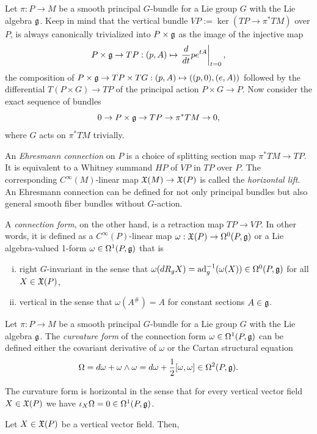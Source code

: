 \documentclass{../../large}
\begin{document}
\begin{prb}
Let $\pi:P\to M$ be a smooth principal $G$-bundle for a Lie group $G$ with the Lie algebra $\mathfrak{g}$.
Keep in mind that the vertical bundle $VP:=\ker(TP\to\pi^*TM)$ over $P$, is always canonically trivialized into $P\times\mathfrak{g}$ as the image of the injective map
\[P\times\mathfrak{g}\to TP:(p,A)\mapsto\left.\frac d{dt}pe^{tA}\right|_{t=0},\]
the composition of $P\times\mathfrak{g}\to TP\times TG:(p,A)\mapsto((p,0),(e,A))$ followed by the differential $T(P\times G)\to TP$ of the principal action $P\times G\to P$.
Now consider the exact sequence of bundles
\[0\to P\times\mathfrak{g}\to TP\to\pi^*TM\to0,\]
where $G$ acts on $\pi^*TM$ trivially.

An \emph{Ehresmann connection} on $P$ is a choice of splitting section map $\pi^*TM\to TP$.
It is equivalent to a Whitney summand $HP$ of $VP$ in $TP$ over $P$.
The corresponding $C^\infty(M)$-linear map $\mathfrak{X}(M)\to\mathfrak{X}(P)$ is called the \emph{horizontal lift}.
An Ehresmann connection can be defined for not only principal bundles but also general smooth fiber bundles without $G$-action.

A \emph{connection form}, on the other hand, is a retraction map $TP\to VP$.
In other words, it is defined as a $C^\infty(P)$-linear map $\omega:\mathfrak{X}(P)\to\Omega^0(P,\mathfrak{g})$ or a Lie algebra-valued 1-form $\omega\in\Omega^1(P,\mathfrak{g})$ that is
\begin{enumerate}[(i)]
\item right $G$-invariant in the sense that $\omega(dR_gX)=\operatorname{ad}_g^{-1}(\omega(X))\in\Omega^0(P,\mathfrak{g})$ for all $X\in\mathfrak{X}(P)$,
\item vertical in the sense that $\omega(A^\#)=A$ for constant sections $A\in\mathfrak{g}$.
\end{enumerate}
\end{prb}

\begin{prb}
Let $\pi:P\to M$ be a smooth principal $G$-bundle for a Lie group $G$ with the Lie algebra $\mathfrak{g}$.
The \emph{curvature form} of the connection form $\omega\in\Omega^1(P,\mathfrak{g})$ can be defined either the covariant derivative of $\omega$ or the Cartan structural equation
\[\Omega=d\omega+\omega\wedge\omega=d\omega+\frac12[\omega,\omega]\in\Omega^2(P,\mathfrak{g}).\]

The curvature form is horizontal in the sense that for every vertical vector field $X\in\mathfrak{X}(P)$ we have $\iota_X\Omega=0\in\Omega^1(P,\mathfrak{g})$.

\end{prb}
\begin{pf}
Let $X\in\mathfrak{X}(P)$ be a vertical vector field.
Then,
\end{pf}
\end{document}
